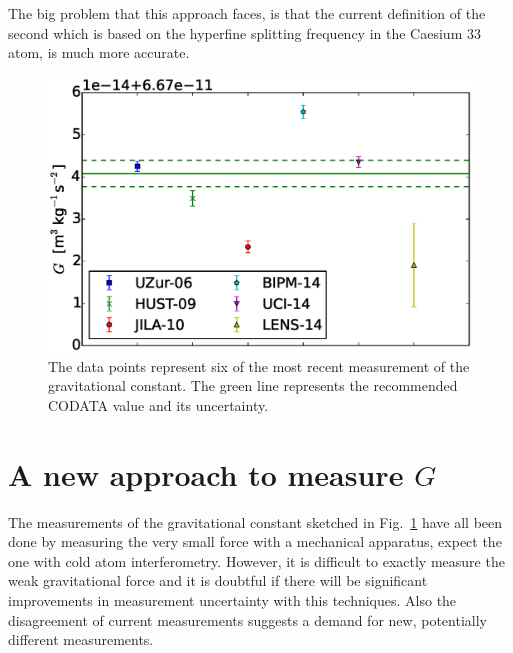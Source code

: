 \documentclass[prb,preprint]{revtex4-1}
\begin{document}
The big problem that this approach faces, is that the current definition of the second which is based on the hyperfine splitting frequency in the Caesium 33 atom, is much more accurate. \\  





\begin{figure}
	\centering
	\includegraphics[width=\textwidth]{img/plotGmeas}
	\caption{The data points represent six of the most recent measurement of the gravitational constant. The green line represents the recommended CODATA value and its uncertainty.}
	\label{fig:Gmeasurements}
\end{figure}

\section{A new approach to measure $G$}

The measurements of the gravitational constant sketched in Fig.~\ref{fig:Gmeasurements} have all been done by measuring the very small force with a mechanical apparatus, expect the one with cold atom interferometry. However, it is difficult to exactly measure the weak gravitational force and it is doubtful if there will be significant improvements in measurement uncertainty with this techniques. Also the disagreement of current measurements suggests a demand for new, potentially different measurements. \\
\end{document}
